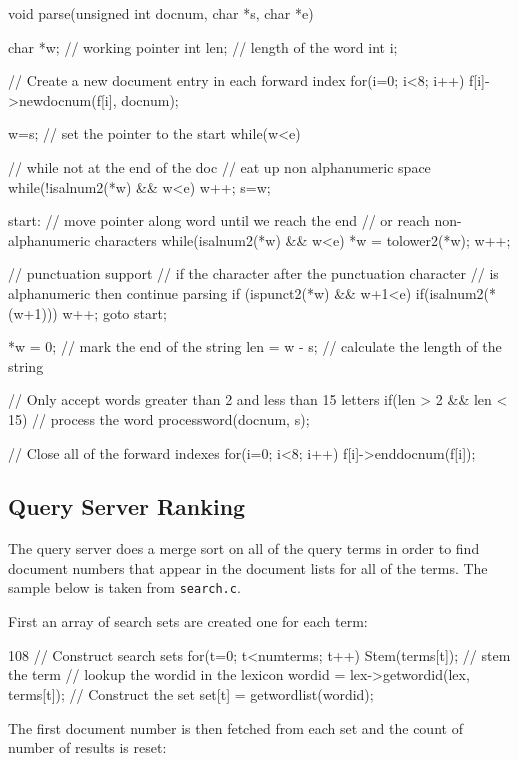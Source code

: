 \begin{listing}{70}
void parse(unsigned int docnum, char *s, char *e) {
  char *w;  // working pointer  
  int len;  // length of the word
  int i;

  // Create a new document entry in each forward index
  for(i=0; i<8; i++)
    f[i]->newdocnum(f[i], docnum);

  w=s;          // set the pointer to the start
  while(w<e) {  // while not at the end of the doc
    // eat up non alphanumeric space
    while(!isalnum2(*w) && w<e)
      w++;
    s=w;
     
  start:
    // move pointer along word until we reach the end
    // or reach non-alphanumeric characters
    while(isalnum2(*w) && w<e) {
      *w = tolower2(*w);  
      w++;
    }

    // punctuation support
    // if the character after the punctuation character
    // is alphanumeric then continue parsing
    if (ispunct2(*w) && w+1<e) {
      if(isalnum2(*(w+1))) {
        w++;
        goto start;
      }
    }

    *w = 0;       // mark the end of the string
    len =  w - s; // calculate the length of the string

    // Only accept words greater than 2 and less than 15 letters
    if(len > 2 && len < 15) {
      // process the word
      processword(docnum, s);
    }
  }
  // Close all of the forward indexes
  for(i=0; i<8; i++)
    f[i]->enddocnum(f[i]);
}

\end{listing}


\subsection{Query Server Ranking}
The query server does a merge sort on all of the query terms in order to find document numbers that appear in the document lists for all of the terms.  The sample below is taken from \texttt{search.c}.  

First an array of search sets are created one for each term:

\begin{listing}{108}
  // Construct search sets
  for(t=0; t<numterms; t++) {
    Stem(terms[t]); // stem the term
    // lookup the wordid in the lexicon
    wordid = lex->getwordid(lex, terms[t]);
    // Construct the set
    set[t] = getwordlist(wordid);
  }
\end{listing}

The first document number is then fetched from each set and the count of number of results is reset:

